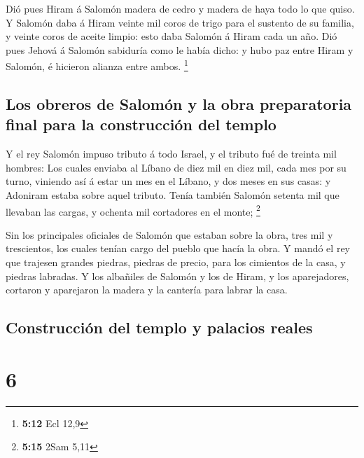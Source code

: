  Dió pues Hiram á Salomón madera de cedro y madera de haya
todo lo que quiso.  Y Salomón daba á Hiram veinte mil coros
de trigo para el sustento de su familia, y veinte coros de aceite
limpio: esto daba Salomón á Hiram cada un año.  Dió pues
Jehová á Salomón sabiduría como le había dicho: y hubo paz entre Hiram y
Salomón, é hicieron alianza entre ambos. \footnote{\textbf{5:12} Ecl
  12,9}

\hypertarget{los-obreros-de-salomuxf3n-y-la-obra-preparatoria-final-para-la-construcciuxf3n-del-templo}{%
\subsection{Los obreros de Salomón y la obra preparatoria final para la
construcción del
templo}\label{los-obreros-de-salomuxf3n-y-la-obra-preparatoria-final-para-la-construcciuxf3n-del-templo}}

 Y el rey Salomón impuso tributo á todo Israel, y el
tributo fué de treinta mil hombres:  Los cuales enviaba al
Líbano de diez mil en diez mil, cada mes por su turno, viniendo así á
estar un mes en el Líbano, y dos meses en sus casas: y Adoniram estaba
sobre aquel tributo.  Tenía también Salomón setenta mil que
llevaban las cargas, y ochenta mil cortadores en el monte; \footnote{\textbf{5:15}
  2Sam 5,11}

 Sin los principales oficiales de Salomón que estaban sobre
la obra, tres mil y trescientos, los cuales tenían cargo del pueblo que
hacía la obra.  Y mandó el rey que trajesen grandes
piedras, piedras de precio, para los cimientos de la casa, y piedras
labradas.  Y los albañiles de Salomón y los de Hiram, y los
aparejadores, cortaron y aparejaron la madera y la cantería para labrar
la casa.

\hypertarget{construcciuxf3n-del-templo-y-palacios-reales}{%
\subsection{Construcción del templo y palacios
reales}\label{construcciuxf3n-del-templo-y-palacios-reales}}

\hypertarget{section-5}{%
\section{6}\label{section-5}}

